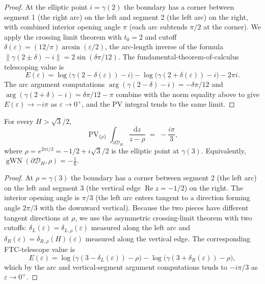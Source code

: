 \begin{proof}
  \leanok
  At the elliptic point $i = \gamma(2)$ the boundary has a corner
  between segment 1 (the right arc) on the left and segment 2 (the
  left arc) on the right, with combined interior opening angle $\pi$
  (each arc subtends $\pi/2$ at the corner). We apply the crossing
  limit theorem with $t_0 = 2$ and cutoff
  $\delta(\varepsilon) = (12/\pi)\arcsin(\varepsilon/2)$, the
  arc-length inverse of the formula
  $\|\gamma(2 \pm \delta) - i\| = 2 \sin(\delta \pi / 12)$. The
  fundamental-theorem-of-calculus telescoping value is
  \[
    E(\varepsilon) =
    \log\!\bigl(\gamma(2 - \delta(\varepsilon)) - i\bigr)
    - \log\!\bigl(\gamma(2 + \delta(\varepsilon)) - i\bigr)
    - 2\pi i.
  \]
  The arc argument computations
  $\arg(\gamma(2-\delta) - i) = -\delta\pi/12$ and
  $\arg(\gamma(2+\delta) - i) = \delta\pi/12 - \pi$ combine with the
  norm equality above to give
  $E(\varepsilon) \to -i\pi$ as $\varepsilon \to 0^{+}$, and the PV
  integral tends to the same limit.
\end{proof}

\begin{theorem}
  \label{thm:gwn-at-rho}
  \leanok
  For every $H > \sqrt{3}/2$,
  \[
    \operatorname{PV}_{\{\rho\}}\!\!\int_{\partial \mathcal{D}_H}
      \frac{\mathrm{d}z}{z - \rho}
    \;=\; -\frac{i\pi}{3},
  \]
  where $\rho = e^{2\pi i / 3} = -1/2 + i\sqrt{3}/2$ is the
  elliptic point at $\gamma(3)$. Equivalently,
  $\operatorname{gWN}(\partial \mathcal{D}_H, \rho) = -\tfrac{1}{6}$.
\end{theorem}

\begin{proof}
  \leanok
  At $\rho = \gamma(3)$ the boundary has a corner between segment 2
  (the left arc) on the left and segment 3 (the vertical edge
  $\operatorname{Re} z = -1/2$) on the right. The interior opening
  angle is $\pi/3$ (the left arc enters tangent to a direction
  forming angle $2\pi/3$ with the downward vertical). Because the
  two pieces have different tangent directions at $\rho$, we use
  the asymmetric crossing-limit theorem with two cutoffs:
  $\delta_L(\varepsilon) = \delta_{L,\rho}(\varepsilon)$ measured
  along the left arc and
  $\delta_R(\varepsilon) = \delta_{R,\rho}(H)(\varepsilon)$ measured
  along the vertical edge. The corresponding FTC-telescope
  value is
  \[
    E(\varepsilon) =
    \log\!\bigl(\gamma(3 - \delta_L(\varepsilon)) - \rho\bigr)
    - \log\!\bigl(\gamma(3 + \delta_R(\varepsilon)) - \rho\bigr),
  \]
  which by the arc and vertical-segment argument computations tends
  to $-i\pi/3$ as $\varepsilon \to 0^{+}$.
\end{proof}


